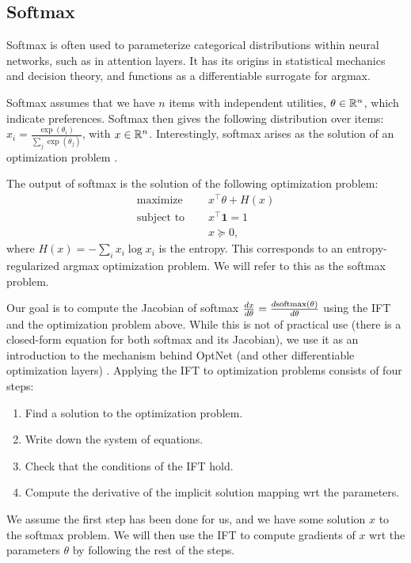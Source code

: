 \documentclass[11pt]{article}
\begin{document}
\subsection{Softmax}
Softmax is often used to parameterize categorical distributions within neural networks,
such as in attention layers.
It has its origins in statistical mechanics and decision theory, and functions
as a differentiable surrogate for argmax.

Softmax assumes that we have $n$ items with independent utilities, $\theta \in \mathbb{R}^n$,
which indicate preferences.
Softmax then gives the following distribution over items:
$x_i = \frac{\exp(\theta_i)}{\sum_j \exp(\theta_j)}$, with $x\in\mathbb{R}^n$.
Interestingly, softmax arises as the solution of an optimization problem
\citep{gao2018properties}.

The output of softmax is the solution of the following optimization problem:
\begin{equation}
\label{eqn:softmax-opt}
\begin{aligned}
\textrm{maximize } \quad & x^\top\theta + H(x)\\
\textrm{subject to } \quad & x^\top \mathbf{1} = 1\\
& x \succeq 0,
\end{aligned}
\end{equation}
where $H(x) = -\sum_i x_i \log x_i$ is the entropy.
This corresponds to an entropy-regularized argmax optimization problem.
We will refer to this as the softmax problem.

Our goal is to compute the Jacobian of softmax
$\frac{dx}{d\theta} = \frac{d\mathrm{softmax}(\theta)}{d\theta}$
using the IFT and the optimization problem above.
While this is not of practical use (there is a closed-form equation
for both softmax and its Jacobian),
we use it as an introduction to the mechanism
behind OptNet (and other differentiable optimization layers)
\citep{optnet,agrawal2019diffcvx}.
Applying the IFT to optimization problems consists of four steps:
\begin{enumerate}
\item Find a solution to the optimization problem.
\item Write down the system of equations.
\item Check that the conditions of the IFT hold.
\item Compute the derivative of the implicit solution mapping wrt the parameters.
\end{enumerate}

We assume the first step has been done for us,
and we have some solution $x$ to the softmax problem.
We will then use the IFT to compute gradients of $x$ wrt the parameters $\theta$
by following the rest of the steps.
\end{document}
